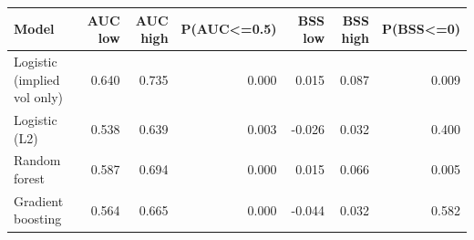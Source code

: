 \begin{tabular}{lrrrrrr}
\toprule
Model & AUC low & AUC high & P(AUC<=0.5) & BSS low & BSS high & P(BSS<=0) \\
\midrule
Logistic (implied vol only) & 0.640 & 0.735 & 0.000 & 0.015 & 0.087 & 0.009 \\
Logistic (L2) & 0.538 & 0.639 & 0.003 & -0.026 & 0.032 & 0.400 \\
Random forest & 0.587 & 0.694 & 0.000 & 0.015 & 0.066 & 0.005 \\
Gradient boosting & 0.564 & 0.665 & 0.000 & -0.044 & 0.032 & 0.582 \\
\bottomrule
\end{tabular}
